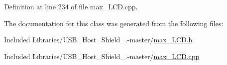 \-Definition at line 234 of file max\-\_\-\-L\-C\-D.\-cpp.



\-The documentation for this class was generated from the following files\-:\begin{DoxyCompactItemize}
\item 
\-Included Libraries/\-U\-S\-B\-\_\-\-Host\-\_\-\-Shield\-\_.-\/master/\hyperlink{max___l_c_d_8h}{max\-\_\-\-L\-C\-D.\-h}\item 
\-Included Libraries/\-U\-S\-B\-\_\-\-Host\-\_\-\-Shield\-\_.-\/master/\hyperlink{max___l_c_d_8cpp}{max\-\_\-\-L\-C\-D.\-cpp}\end{DoxyCompactItemize}
